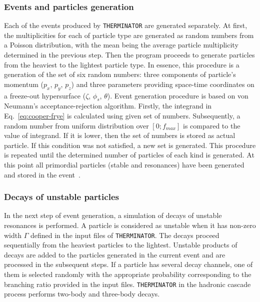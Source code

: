     \subsubsection{Events and particles generation}
      Each of the events produced by \verb|THERMINATOR| are generated separately.
      At first, the multiplicities for each of particle type are generated as random numbers from a Poisson distribution, with the mean being the average particle multiplicity determined in the previous step.
      Then the program proceeds to generate particles from the heaviest to the lightest particle type.
      In essence, this procedure is a generation of the set of six random numbers: three components of particle's momentum ($p_x$, $p_y$, $p_z$) and three parameters providing space-time coordinates on a freeze-out hypersurface ($\zeta$, $\phi_s$, $\theta$).
      Event generation procedure is based on von Neumann's acceptance-rejection algorithm.
      Firstly, the integrand in Eq.~\ref{eq:cooper-frye} is calculated using given set of numbers.
      Subsequently, a random number from uniform distribution over $[0;f_{max}]$ is compared to the value of integrand.
      If it is lower, then the set of numbers is stored as actual particle.
      If this condition was not satisfied, a new set is generated.
      This procedure is repeated until the determined number of particles of each kind is generated.
      At this point all primordial particles (stable and resonances) have been generated and stored in the event~\cite{therminator}.
    \subsubsection{Decays of unstable particles}
      In the next step of event generation, a simulation of decays of unstable resonances is performed.
      A particle is considered as unstable when it has non-zero width $\Gamma$ defined in the input files of \verb|THERMINATOR|.
      The decays proceed sequentially from the heaviest particles to the lightest.
      Unstable products of decays are added to the particles generated in the current event and are processed in the subsequent steps.
      If a particle has several decay channels, one of them is selected randomly with the appropriate probability corresponding to the branching ratio provided in the input files.
      \verb|THERMINATOR| in the hadronic cascade process performs two-body and three-body decays.


